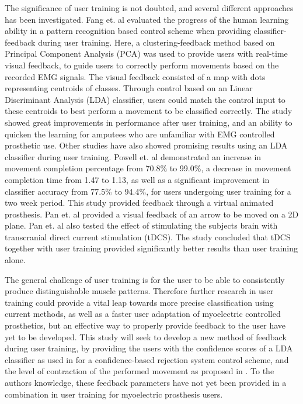 The significance of user training is not doubted, and several different approaches has been investigated. Fang et. al \cite{Fang2017} evaluated the progress of the human learning ability in a pattern recognition based control scheme when providing classifier-feedback during user training. Here, a clustering-feedback method based on Principal Component Analysis (PCA) was used to provide users with real-time visual feedback, to guide users to correctly perform movements based on the recorded EMG signals. The visual feedback consisted of a map with dots representing centroids of classes. Through control based on an Linear Discriminant Analysis (LDA) classifier, users could match the control input to these centroids to best perform a movement to be classified correctly. The study showed great improvements in performance after user training, and an ability to quicken the learning for amputees who are unfamiliar with EMG controlled prosthetic use. \cite{Fang2017}
Other studies have also showed promising results using an LDA classifier during user training. Powell et. al \cite{Powell2014} demonstrated an increase in movement completion percentage from 70.8\% to 99.0\%, a decrease in movement completion time from 1.47 to 1.13, as well as a significant improvement in classifier accuracy from 77.5\% to 94.4\%, for users undergoing user training for a two week period. This study provided feedback through a virtual animated prosthesis.
Pan et. al \cite{Pan2017} provided a visual feedback of an arrow to be moved on a 2D plane. Pan et. al also tested the effect of stimulating the subjects brain with transcranial direct current stimulation (tDCS). The study concluded that tDCS together with user training provided significantly better results than user training alone. \cite{Pan2017}

The general challenge of user training is for the user to be able to consistently produce distinguishable muscle patterns. \cite{Powell2014} Therefore further research in user training could provide a vital leap towards more precise classification using current methods, as well as a faster user adaptation of myoelectric controlled prosthetics, but an effective way to properly provide feedback to the user have yet to be developed. 
This study will seek to develop a new method of feedback during user training, by providing the users with the confidence scores of a LDA classifier as used in \cite{Scheme2013} for a confidence-based rejection system control scheme, and the level of contraction of the performed movement as proposed in \cite{Englehart2003}. To the authors knowledge, these feedback parameters have not yet been provided in a combination in user training for myoelectric prosthesis users. %

